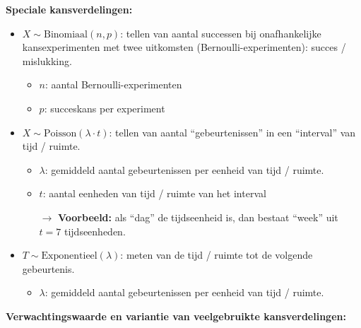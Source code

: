 \documentclass[11pt,a4paper,dutch]{article} %
\begin{document}
\textbf{Speciale kansverdelingen:}
\begin{itemize}
    \item $X \sim \text{Binomiaal}(n, p)$: tellen van aantal successen bij onafhankelijke kansexperimenten met twee uitkomsten (Bernoulli-experimenten): succes / mislukking.
    \begin{itemize}
        \item $n$: aantal Bernoulli-experimenten
        \item $p$: succeskans per experiment
    \end{itemize}
    \item $X \sim \text{Poisson}(\lambda \cdot t)$: tellen van aantal ``gebeurtenissen'' in een ``interval'' van tijd / ruimte.
    \begin{itemize}
        \item $\lambda$: gemiddeld aantal gebeurtenissen per eenheid van tijd / ruimte.  
        \item $t$: aantal eenheden van tijd / ruimte van het interval
        
        $\rightarrow$ \textbf{Voorbeeld:} als ``dag'' de tijdseenheid is, dan bestaat ``week'' uit $t=7$ tijdseenheden. 
    \end{itemize}
    \item $T \sim \text{Exponentieel}(\lambda)$: meten van de tijd / ruimte tot de volgende gebeurtenis.
    \begin{itemize}
        \item $\lambda$: gemiddeld aantal gebeurtenissen per eenheid van tijd / ruimte.  
    \end{itemize}
\end{itemize}
\newpage
\textbf{Verwachtingswaarde en variantie van veelgebruikte kansverdelingen:}
\end{document}
